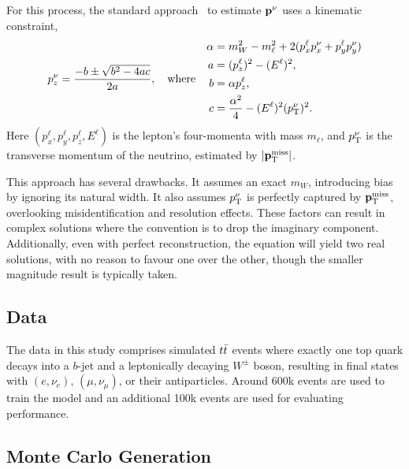 For this process, the standard approach~\cite{Quad1, Quad2, Quad4, Quad5} to estimate $\mathbf{p}^\nu$ uses a kinematic constraint,
\begin{equation}
    \label{eq:quadratic}
    p_z^\nu = \frac{-b \pm \sqrt{b^2-4ac}}{2a}, \quad \text{where} \quad
    \begin{aligned}
        \alpha &= m_W^2 - m_\ell^2+2(p_x^\ell p_x^\nu+p_y^\ell p_y^\nu) \\
        a &= (p_z^\ell)^2 - (E^\ell)^2, \\
        b &= \alpha p_z^\ell, \\
        c &= \frac{\alpha^2}{4}-(E^\ell)^2(p_{\text{T}}^\nu)^2.
    \end{aligned}
\end{equation}
Here $(p_x^\ell, p_y^\ell, p_z^\ell, E^\ell)$ is the lepton's four-momenta with mass $m_\ell$, and $p_{\text{T}}^\nu$ is the transverse momentum of the neutrino, estimated by $|\mathbf{p}_{\text{T}}^{\text{miss}}|$.

This approach has several drawbacks.
It assumes an exact $m_W$, introducing bias by ignoring its natural width.
It also assumes $p_{\text{T}}^\nu$ is perfectly captured by $\mathbf{p}_{\text{T}}^{\text{miss}}$, overlooking misidentification and resolution effects.
These factors can result in complex solutions where the convention is to drop the imaginary component.
Additionally, even with perfect reconstruction, the equation will yield two real solutions, with no reason to favour one over the other, though the smaller magnitude result is typically taken.

\subsection{Data}

The data in this study comprises simulated $t\bar{t}$ events where exactly one top quark decays into a $b$-jet and a leptonically decaying $W^\pm$ boson, resulting in final states with $(e,\nu_e)$, $(\mu,\nu_\mu)$, or their antiparticles.
Around 600k events are used to train the model and an additional 100k events are used for evaluating performance.

\subsection{Monte Carlo Generation}

